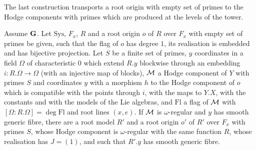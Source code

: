The last construction transports a root origin with empty set of primes to the Hodge components with primes
which are produced at the levels of the tower.

\begin{proposition}\label{pf:towergeo:rootcov}
Assume $\mathbf G$. Let $\mathrm{Sys}$, $F_x$, $R$ and a root origin $o$ of $R$ over $F_x$ with empty set of primes
be given, such that the flag of $o$ has degree $1$, its realisation is embedded and has bijective projection. Let
$S$ be a finite set of primes, $y$ coordinates in a field $\Omega$ of characteristic $0$ which extend $R.y$
blockwise through an embedding $i\colon R.\Omega\to\Omega$ (with an injective map of blocks), $\mathcal M$ a Hodge
component of $Y$ with primes $S$ and coordinates $y$ with a morphism $h$ to the Hodge component of $o$ which is
compatible with the points through $i$, with the maps to $Y.X$, with the constants and with the models of the Lie
algebras, and $\mathrm{Fl}$ a flag of $\mathcal M$ with $[\Omega:R.\Omega]=\deg\mathrm{Fl}$ and root lines
$(x,e)$. If $\mathcal M$ is $\omega$-regular and $y$ has smooth generic fibre, there are a root model $R'$ and a
root origin $o'$ of $R'$ over $F_x$ with primes $S$, whose Hodge component is $\omega$-regular with the same
function $R$, whose realisation has $J=(1)$, and such that $R'.y$ has smooth generic fibre.
\end{proposition}

